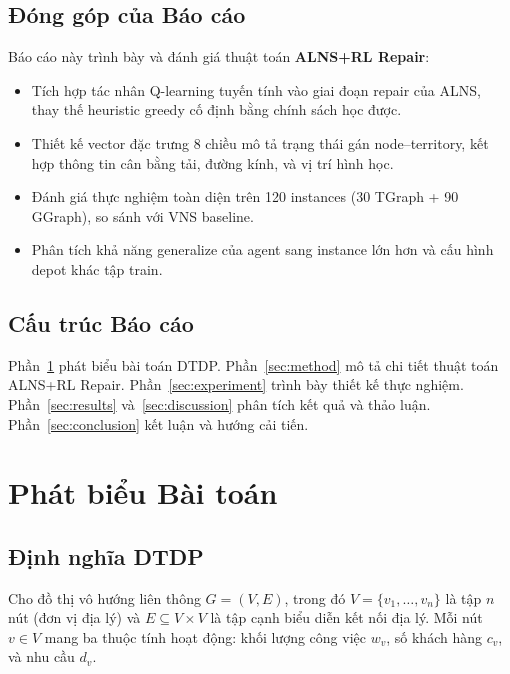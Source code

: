 \documentclass[12pt, a4paper]{article}
\begin{document}
\subsection{Đóng góp của Báo cáo}

Báo cáo này trình bày và đánh giá thuật toán \textbf{ALNS+RL Repair}:
\begin{itemize}
  \item Tích hợp tác nhân Q-learning tuyến tính vào giai đoạn repair của ALNS,
        thay thế heuristic greedy cố định bằng chính sách học được.
  \item Thiết kế vector đặc trưng 8 chiều mô tả trạng thái gán node--territory,
        kết hợp thông tin cân bằng tải, đường kính, và vị trí hình học.
  \item Đánh giá thực nghiệm toàn diện trên 120 instances (30 TGraph + 90 GGraph),
        so sánh với VNS baseline.
  \item Phân tích khả năng generalize của agent sang instance lớn hơn và cấu
        hình depot khác tập train.
\end{itemize}

\subsection{Cấu trúc Báo cáo}

Phần~\ref{sec:problem} phát biểu bài toán DTDP.
Phần~\ref{sec:method} mô tả chi tiết thuật toán ALNS+RL Repair.
Phần~\ref{sec:experiment} trình bày thiết kế thực nghiệm.
Phần~\ref{sec:results} và~\ref{sec:discussion} phân tích kết quả và thảo luận.
Phần~\ref{sec:conclusion} kết luận và hướng cải tiến.

\section{Phát biểu Bài toán}
\label{sec:problem}

\subsection{Định nghĩa DTDP}

Cho đồ thị vô hướng liên thông $G = (V, E)$, trong đó $V = \{v_1, \ldots, v_n\}$
là tập $n$ nút (đơn vị địa lý) và $E \subseteq V \times V$ là tập cạnh biểu diễn
kết nối địa lý. Mỗi nút $v \in V$ mang ba thuộc tính hoạt động:
khối lượng công việc $w_v$, số khách hàng $c_v$, và nhu cầu $d_v$.
\end{document}
